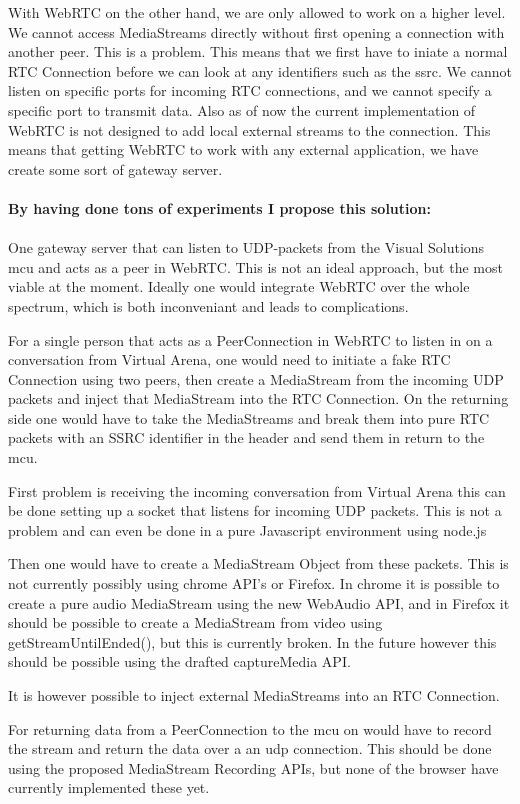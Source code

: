 With WebRTC on the other hand, we are only allowed to work on a higher level. We cannot access MediaStreams directly without first opening a connection with another peer. This is a problem. This means that we first have to iniate a normal RTC Connection before we can look at any identifiers such as the \gls{ssrc}. We cannot listen on specific ports for incoming RTC connections, and we cannot specify a specific port to transmit data. Also as of now the current implementation of WebRTC is not designed to add local external streams to the connection. This means that getting WebRTC to work with any external application, we have create some sort of gateway server.
\\
\\
\textbf{By having done tons of experiments I propose this solution:}
\\
\\
One gateway server that can listen to UDP-packets from the Visual Solutions \gls{mcu} and acts as a peer in WebRTC. This is not an ideal approach, but the most viable at the moment. Ideally one would integrate WebRTC over the whole spectrum, which is both inconveniant and leads to complications.

For a single person that acts as a PeerConnection in WebRTC to listen in on a conversation from Virtual Arena, one would need to initiate a fake RTC Connection using two peers, then create a MediaStream from the incoming UDP packets and inject that MediaStream into the RTC Connection. On the returning side one would have to take the MediaStreams and break them into pure RTC packets with an SSRC identifier in the header and send them in return to the \gls{mcu}.

First problem is receiving the incoming conversation from Virtual Arena this can be done setting up a socket that listens for incoming UDP packets. This is not a problem and can even be done in a pure Javascript environment using node.js

Then one would have to create a MediaStream Object from these packets. This is not currently possibly using chrome API's or Firefox. In chrome it is possible to create a pure audio MediaStream using the new WebAudio API, and in Firefox it should be possible to create a MediaStream from video using getStreamUntilEnded(), but this is currently broken. In the future however this should be possible using the drafted captureMedia API.

It is however possible to inject external MediaStreams into an RTC Connection.

For returning data from a PeerConnection to the \gls{mcu} on would have to record the stream and return the data over a an \gls{udp} connection. This should be done using the proposed MediaStream Recording APIs, but none of the browser have currently implemented these yet.